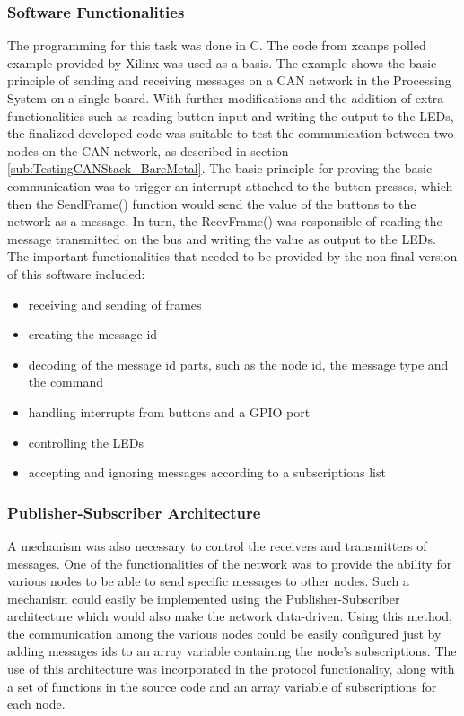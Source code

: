 \subsubsection{Software Functionalities}\label{sub:Basic_SourceCode}
The programming for this task was done in C.
The code from xcanps polled example provided by Xilinx was used as a basis.
The example shows the basic principle of sending and receiving messages on a CAN network in the Processing System on a single board.
With further modifications and the addition of extra functionalities such as reading button input and writing the output to the LEDs, the finalized developed code was suitable to test the communication between two nodes on the CAN network, as described in section \ref{sub:TestingCANStack_BareMetal}.
The basic principle for proving the basic communication was to trigger an interrupt attached to the button presses, which then the SendFrame() function would send the value of the buttons to the network as a message.
In turn, the RecvFrame() was responsible of reading the message transmitted on the bus and writing the value as output to the LEDs.
The important functionalities that needed to be provided by the non-final version of this software included:
\begin{itemize}
\item receiving and sending of frames
\item creating the message id
\item decoding of the message id parts, such as the node id, the message type and the command
\item handling interrupts from buttons and a GPIO port
\item controlling the LEDs
\item accepting and ignoring messages according to a subscriptions list
\end{itemize}

\subsubsection{Publisher-Subscriber Architecture}
A mechanism was also necessary to control the receivers and transmitters of messages.
One of the functionalities of the network was to provide the ability for various nodes to be able to send specific messages to other nodes.
Such a mechanism could easily be implemented using the Publisher-Subscriber architecture which would also make the network data-driven.
Using this method, the communication among the various nodes could be easily configured just by adding messages ids to an array variable containing the node's subscriptions.
The use of this architecture was incorporated in the protocol functionality, along with a set of functions in the source code and an array variable of subscriptions for each node.

